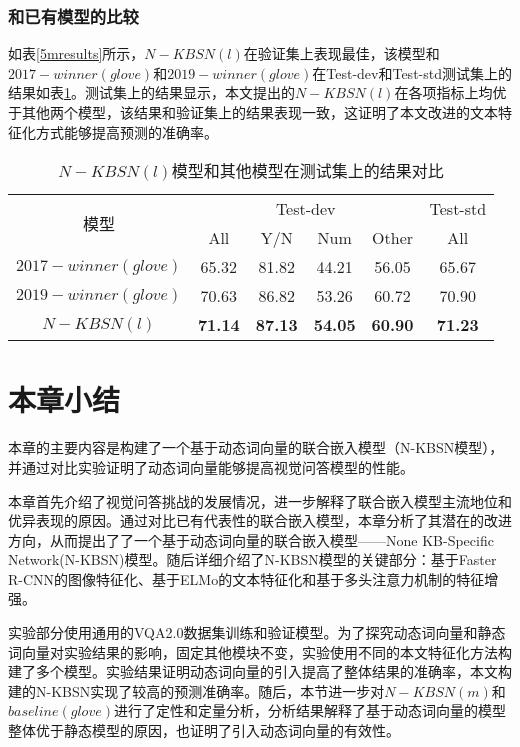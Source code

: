 \subsubsection{和已有模型的比较}
如表\ref{5mresults}所示，$N-KBSN(l)$在验证集上表现最佳，该模型和$2017-winner(glove)$和$2019-winner(glove)$在Test-dev和Test-std测试集上的结果如表\ref{testres}。测试集上的结果显示，本文提出的$N-KBSN(l)$在各项指标上均优于其他两个模型，该结果和验证集上的结果表现一致，这证明了本文改进的文本特征化方式能够提高预测的准确率。
\begin{table}[H]
\centering
\caption{$N-KBSN(l)$模型和其他模型在测试集上的结果对比}
\begin{tabular}{c|cccc|c}
\toprule
\multirow{2}{*}{模型} & \multicolumn{4}{c|}{Test-dev} & Test-std\\
& All & Y/N & Num & Other & All \\
\midrule
$2017-winner(glove)$ & 65.32 & 81.82 & 44.21 & 56.05 & 65.67\\
$2019-winner(glove)$ & 70.63 & 86.82 & 53.26 & 60.72 & 70.90\\
\midrule
$N-KBSN(l)$& \textbf{71.14} & \textbf{87.13} & \textbf{54.05} & \textbf{60.90} & \textbf{71.23} \\
\bottomrule
\end{tabular}
\label{testres}
\end{table}

\section{本章小结}
本章的主要内容是构建了一个基于动态词向量的联合嵌入模型（N-KBSN模型），并通过对比实验证明了动态词向量能够提高视觉问答模型的性能。

本章首先介绍了视觉问答挑战的发展情况，进一步解释了联合嵌入模型主流地位和优异表现的原因。通过对比已有代表性的联合嵌入模型，本章分析了其潜在的改进方向，从而提出了了一个基于动态词向量的联合嵌入模型——None KB-Specific Network(N-KBSN)模型。随后详细介绍了N-KBSN模型的关键部分：基于Faster R-CNN的图像特征化、基于ELMo的文本特征化和基于多头注意力机制的特征增强。

实验部分使用通用的VQA2.0数据集训练和验证模型。为了探究动态词向量和静态词向量对实验结果的影响，固定其他模块不变，实验使用不同的本文特征化方法构建了多个模型。实验结果证明动态词向量的引入提高了整体结果的准确率，本文构建的N-KBSN实现了较高的预测准确率。随后，本节进一步对$N-KBSN(m)$和$baseline(glove)$进行了定性和定量分析，分析结果解释了基于动态词向量的模型整体优于静态模型的原因，也证明了引入动态词向量的有效性。



